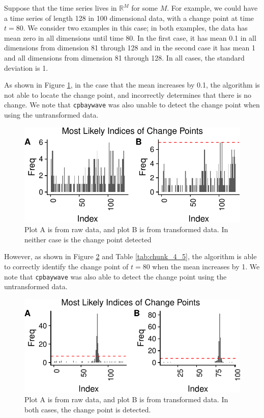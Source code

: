 \documentclass[smallextended]{svjour3}       %
\begin{document}
\begin{example}\label{ex:1} Suppose that the time series lives in
\(\mathbb {R}^M\) for some \(M\). For example, we could have a time
series of length 128 in 100 dimensional data, with a change point at
time \(t = 80\). We consider two examples in this case; in both
examples, the data has mean zero in all dimensions until time 80. In the
first case, it has mean 0.1 in all dimensions from dimension 81 through
128 and in the second case it has mean 1 and all dimensions from
dimension 81 through 128. In all cases, the standard deviation is 1.

As shown in Figure \ref{fig:2}, in the case that the mean increases by 0.1, the algorithm is not able to
locate the change point, and incorrectly determines that there is no change. We note that \texttt{cpbaywave} was also unable to detect the change point when using the untransformed data.

\begin{figure}[h!]\includegraphics{springer_template_files/figure-latex/chunk_3-1}
\caption{Plot A is from raw data, and plot B is from transformed data. In neither case is the change point detected}
 \label{fig:2}\end{figure}

However, as shown in Figure \ref{fig:3} and Table \ref{tab:chunk_4_5}, the algorithm is able to correctly identify the change point of $t = 80$ when the mean increases by 1. We note that \texttt{cpbaywave} was also able to detect the change point using the untransformed data.


\begin{figure}[H]\includegraphics{springer_template_files/figure-latex/chunk_4_5-1} 
\caption{Plot A is from raw data, and plot B is from transformed data. In both cases, the change point is detected.}
\label{fig:3}\end{figure}


\end{example}
\end{document}
